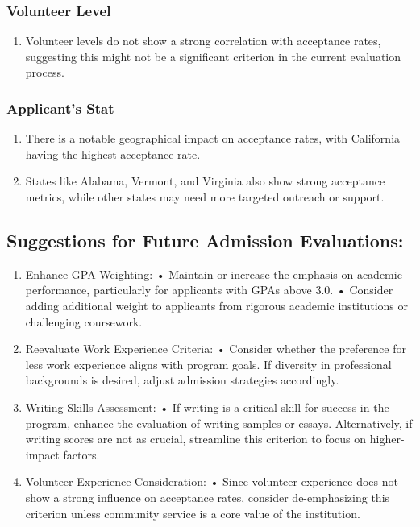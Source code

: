 \documentclass[
  letterpaper,
  DIV=11,
  numbers=noendperiod]{scrartcl}
\providecommand{\tightlist}{%
  \setlength{\itemsep}{0pt}\setlength{\parskip}{0pt}}\usepackage{longtable,booktabs,array}
\begin{document}
\subsubsection{Volunteer Level}\label{volunteer-level}

\begin{enumerate}
\def\labelenumi{\arabic{enumi}.}
\tightlist
\item
  Volunteer levels do not show a strong correlation with acceptance
  rates, suggesting this might not be a significant criterion in the
  current evaluation process.
\end{enumerate}

\subsubsection{Applicant's Stat}\label{applicants-stat}

\begin{enumerate}
\def\labelenumi{\arabic{enumi}.}
\tightlist
\item
  There is a notable geographical impact on acceptance rates, with
  California having the highest acceptance rate.
\item
  States like Alabama, Vermont, and Virginia also show strong acceptance
  metrics, while other states may need more targeted outreach or
  support.
\end{enumerate}

\subsection{Suggestions for Future Admission
Evaluations:}\label{suggestions-for-future-admission-evaluations}

\begin{enumerate}
\def\labelenumi{\arabic{enumi}.}
\item
  Enhance GPA Weighting: • Maintain or increase the emphasis on academic
  performance, particularly for applicants with GPAs above 3.0. •
  Consider adding additional weight to applicants from rigorous academic
  institutions or challenging coursework.
\item
  Reevaluate Work Experience Criteria: • Consider whether the preference
  for less work experience aligns with program goals. If diversity in
  professional backgrounds is desired, adjust admission strategies
  accordingly.
\item
  Writing Skills Assessment: • If writing is a critical skill for
  success in the program, enhance the evaluation of writing samples or
  essays. Alternatively, if writing scores are not as crucial,
  streamline this criterion to focus on higher-impact factors.
\item
  Volunteer Experience Consideration: • Since volunteer experience does
  not show a strong influence on acceptance rates, consider
  de-emphasizing this criterion unless community service is a core value
  of the institution.
\end{enumerate}
\end{document}
